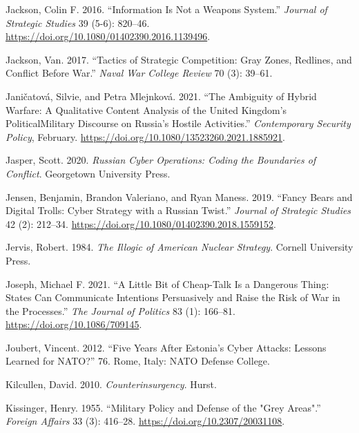 \documentclass[
]{article}
\begin{document}
\leavevmode\hypertarget{ref-jackson_informationnotweapons_2016}{}%
Jackson, Colin F. 2016. ``Information Is Not a Weapons System.'' \emph{Journal of Strategic Studies} 39 (5-6): 820--46. \url{https://doi.org/10.1080/01402390.2016.1139496}.

\leavevmode\hypertarget{ref-jackson_tacticsstrategiccompetition_2017}{}%
Jackson, Van. 2017. ``Tactics of Strategic Competition: Gray Zones, Redlines, and Conflict Before War.'' \emph{Naval War College Review} 70 (3): 39--61.

\leavevmode\hypertarget{ref-janicatova_ambiguityhybridwarfare_2021}{}%
Janičatová, Silvie, and Petra Mlejnková. 2021. ``The Ambiguity of Hybrid Warfare: A Qualitative Content Analysis of the United Kingdom's PoliticalMilitary Discourse on Russia's Hostile Activities.'' \emph{Contemporary Security Policy}, February. \url{https://doi.org/10.1080/13523260.2021.1885921}.

\leavevmode\hypertarget{ref-jasper_russiancyberoperations_2020}{}%
Jasper, Scott. 2020. \emph{Russian Cyber Operations: Coding the Boundaries of Conflict}. Georgetown University Press.

\leavevmode\hypertarget{ref-jensen_fancybearsdigital_2019}{}%
Jensen, Benjamin, Brandon Valeriano, and Ryan Maness. 2019. ``Fancy Bears and Digital Trolls: Cyber Strategy with a Russian Twist.'' \emph{Journal of Strategic Studies} 42 (2): 212--34. \url{https://doi.org/10.1080/01402390.2018.1559152}.

\leavevmode\hypertarget{ref-jervis_illogicamericannuclear_1984}{}%
Jervis, Robert. 1984. \emph{The Illogic of American Nuclear Strategy}. Cornell University Press.

\leavevmode\hypertarget{ref-joseph_littlebitcheaptalk_2021}{}%
Joseph, Michael F. 2021. ``A Little Bit of Cheap-Talk Is a Dangerous Thing: States Can Communicate Intentions Persuasively and Raise the Risk of War in the Processes.'' \emph{The Journal of Politics} 83 (1): 166--81. \url{https://doi.org/10.1086/709145}.

\leavevmode\hypertarget{ref-joubert_fiveyearsestonia_2012}{}%
Joubert, Vincent. 2012. ``Five Years After Estonia's Cyber Attacks: Lessons Learned for NATO?'' 76. Rome, Italy: NATO Defense College.

\leavevmode\hypertarget{ref-kilcullen_counterinsurgency_2010}{}%
Kilcullen, David. 2010. \emph{Counterinsurgency}. Hurst.

\leavevmode\hypertarget{ref-kissinger_militarypolicydefense_1955}{}%
Kissinger, Henry. 1955. ``Military Policy and Defense of the "Grey Areas".'' \emph{Foreign Affairs} 33 (3): 416--28. \url{https://doi.org/10.2307/20031108}.
\end{document}
